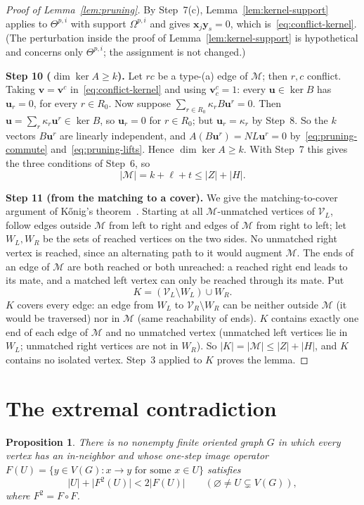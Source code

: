 \documentclass[11pt]{article}
\newtheorem{proposition}[theorem]{Proposition}
\theoremstyle{remark}
\newcommand{\abs}[1]{\lvert #1\rvert}
\newcommand{\step}[1]{\par\smallskip\noindent\textbf{Step #1.}}
\newcommand{\cM}{\mathcal M}
\newcommand{\bu}{\mathbf u}
\newcommand{\bv}{\mathbf v}
\begin{document}
\begin{proof}[Proof of Lemma~\ref{lem:pruning}]
By Step~7(c), Lemma~\ref{lem:kernel-support} applies to $\Theta^{p,i}$ with
support $\Omega^{p,i}$ and gives $\mathbf x_j\mathbf y_s=0$, which
is~\eqref{eq:conflict-kernel}. (The perturbation inside the proof of
Lemma~\ref{lem:kernel-support} is hypothetical and concerns only
$\Theta^{p,i}$; the assignment is not changed.)

\step{10 ($\dim\ker A\ge k$)} Let $rc$ be a type-(a) edge of $\cM$; then $r,c$
conflict. Taking $\bv=\bv^c$ in~\eqref{eq:conflict-kernel} and using
$\bv^c_c=1$: every $\bu\in\ker B$ has $\bu_r=0$, for every $r\in R_0$. Now
suppose $\sum_{r\in R_0}\kappa_rB\bu^r=0$. Then
$\bu=\sum_r\kappa_r\bu^r\in\ker B$, so $\bu_r=0$ for $r\in R_0$; but
$\bu_r=\kappa_r$ by Step~8. So the $k$ vectors $B\bu^r$ are linearly
independent, and $A(B\bu^r)=NL\bu^r=0$ by~\eqref{eq:pruning-commute}
and~\eqref{eq:pruning-lifts}. Hence $\dim\ker A\ge k$. With Step~7 this gives
the three conditions of Step~6, so
\[
 \abs{\cM}=k+\ell+t\le\abs Z+\abs H.
\]

\step{11 (from the matching to a cover)} We give the matching-to-cover argument
of K\H{o}nig's theorem~\cite{konig1931}. Starting at all $\cM$-unmatched
vertices of $\mathcal V_L$, follow edges outside $\cM$ from left to right and
edges of $\cM$ from right to left; let $W_L,W_R$ be the sets of reached
vertices on the two sides. No unmatched right vertex is reached, since an
alternating path to it would augment $\cM$. The ends of an edge of $\cM$ are
both reached or both unreached: a reached right end leads to its mate, and a
matched left vertex can only be reached through its mate. Put
\[
 K=(\mathcal V_L\setminus W_L)\cup W_R.
\]
$K$ covers every edge: an edge from $W_L$ to $\mathcal V_R\setminus W_R$ can be
neither outside $\cM$ (it would be traversed) nor in $\cM$ (same reachability
of ends). $K$ contains exactly one end of each edge of $\cM$ and no unmatched
vertex (unmatched left vertices lie in $W_L$; unmatched right vertices are not
in $W_R$). So $\abs K=\abs{\cM}\le\abs Z+\abs H$, and $K$ contains no isolated
vertex. Step~3 applied to $K$ proves the lemma.
\end{proof}

\section{The extremal contradiction}\label{sec:incompatibility}

\begin{proposition}\label{prop:no-concavity}
There is no nonempty finite oriented graph $G$ in which every vertex has an
in-neighbor and whose one-step image operator
$F(U)=\{y\in V(G):x\to y\text{ for some }x\in U\}$ satisfies
\begin{equation}\label{eq:impossible-concavity}
 \abs{U}+\abs{F^2(U)}<2\abs{F(U)}
 \qquad(\varnothing\ne U\subsetneq V(G)),
\end{equation}
where $F^2=F\circ F$.
\end{proposition}
\end{document}
